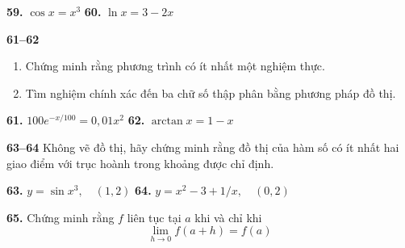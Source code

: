 \begin{minipage}[t]{0.485\textwidth}
\vspace{0.35em}
\textbf{59.} $\cos x = x^3$ \hfill \textbf{60.} $\ln x = 3 - 2x$

\vspace{0.75em}
\noindent\graphingcalcicon\;\textbf{\color{stewartcyan}61--62}\hspace{0.4em}%
\begin{minipage}[t]{0.74\linewidth}
\begin{enumerate}[label=\textnormal{(\alph*)}, itemsep=1.5pt, topsep=0pt, leftmargin=*, parsep=0pt]
    \item Chứng minh rằng phương trình có ít nhất một nghiệm thực.
    \item Tìm nghiệm chính xác đến ba chữ số thập phân bằng phương pháp đồ thị.
\end{enumerate}
\end{minipage}

\vspace{0.35em}
\textbf{61.} $100e^{-x/100} = 0{,}01x^2$ \hfill \textbf{62.} $\arctan x = 1 - x$

\vspace{0.75em}
\textbf{\color{stewartcyan}63--64}\; Không vẽ đồ thị, hãy chứng minh rằng đồ thị của hàm số có ít nhất hai giao điểm với trục hoành trong khoảng được chỉ định.

\vspace{0.35em}
\textbf{63.} $y = \sin x^3, \quad (1, 2)$ \hfill \textbf{64.} $y = x^2 - 3 + 1/x, \quad (0, 2)$

\vspace{0.75em}
\textbf{65.} Chứng minh rằng $f$ liên tục tại $a$ khi và chỉ khi
\[
\lim_{h \to 0} f(a + h) = f(a)
\]
\end{minipage}%
\hfill
